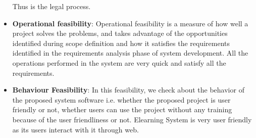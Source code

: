 \begin{itemize}
Thus is the legal process.
\item {\bf{Operational feasibility}}: Operational feasibility is a measure 
of how well a project solves the problems, and takes advantage of the 
opportunities identified during scope definition and how it satisfies 
the requirements identified in the requirements analysis phase of system 
development. All the operations performed in the system are very quick 
and satisfy all the requirements.
\item {\bf{Behaviour Feasibility}}: In this feasibility, we check about the 
behavior of the proposed system software i.e. whether the proposed 
project is user friendly or not, whether users can use the project 
without any training because of the user friendliness or not. Elearning System is very user friendly as its users interact with it 
through web.
\end{itemize}

